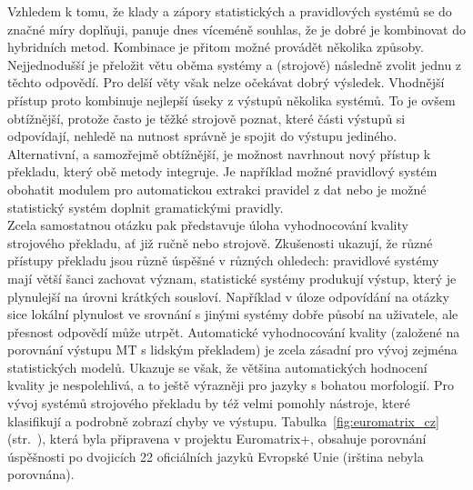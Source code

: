 \begin{multicols}{2}
Vzhledem k tomu, že klady a zápory statistických a pravidlových systémů se do značné míry doplňuji, panuje dnes víceméně souhlas, že je dobré je kombinovat do hybridních metod. Kombinace je přitom možné provádět několika způsoby. Nejjednodušší je přeložit větu oběma systémy a (strojově) následně zvolit jednu z těchto odpovědí. Pro delší věty však nelze očekávat dobrý výsledek. Vhodnější přístup proto kombinuje nejlepší úseky z výstupů několika systémů. To je ovšem obtížnější, protože často je těžké strojově poznat, které části výstupů si odpovídají, nehledě na nutnost správně je spojit do výstupu jediného.\\
Alternativní, a samozřejmě obtížnější, je možnost navrhnout nový přístup k překladu, který obě metody integruje. Je například možné pravidlový systém obohatit modulem pro automatickou extrakci pravidel z dat nebo je možné statistický systém doplnit gramatickými pravidly.\\
Zcela samostatnou otázku pak představuje úloha vyhodnocování kvality strojového překladu, ať již ručně nebo strojově. Zkušenosti ukazují, že různé přístupy překladu jsou různě úspěšné v různých ohledech: pravidlové systémy mají větší šanci zachovat význam, statistické systémy produkují výstup, který je plynulejší na úrovni krátkých sousloví. Například v úloze odpovídání na otázky sice lokální plynulost ve srovnání s jinými systémy dobře působí na uživatele, ale přesnost odpovědí může utrpět. Automatické vyhodnocování kvality (založené na porovnání výstupu MT s lidským překladem) je zcela zásadní pro vývoj zejména statistických modelů. Ukazuje se však, že většina automatických hodnocení kvality je nespolehlivá, a to ještě výrazněji pro jazyky s bohatou morfologií. Pro vývoj systémů strojového překladu by též velmi pomohly nástroje, které klasifikují a podrobně zobrazí chyby ve výstupu.
Tabulka~\ref{fig:euromatrix_cz} (str.~\pageref{fig:euromatrix_cz}), která byla připravena v projektu Euromatrix+, obsahuje porovnání úspěšnosti po dvojicích 22 oficiálních jazyků Evropské Unie (irština nebyla porovnána).


\end{multicols}
